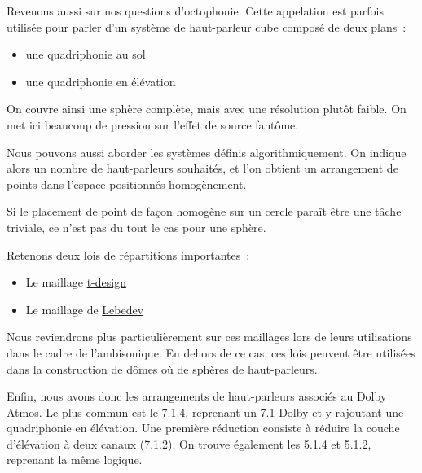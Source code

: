 \documentclass[
  letterpaper,
  DIV=11,
  numbers=noendperiod]{scrreprt}
\providecommand{\tightlist}{%
  \setlength{\itemsep}{0pt}\setlength{\parskip}{0pt}}\usepackage{longtable,booktabs,array}
\begin{document}
Revenons aussi sur nos questions d'octophonie. Cette appelation est
parfois utilisée pour parler d'un système de haut-parleur cube composé
de deux plans~:

\begin{itemize}
\tightlist
\item
  une quadriphonie au sol
\item
  une quadriphonie en élévation
\end{itemize}

On couvre ainsi une sphère complète, mais avec une résolution plutôt
faible. On met ici beaucoup de pression sur l'effet de source fantôme.

Nous pouvons aussi aborder les systèmes définis algorithmiquement. On
indique alors un nombre de haut-parleurs souhaités, et l'on obtient un
arrangement de points dans l'espace positionnés homogènement.

\begin{tcolorbox}[enhanced jigsaw, leftrule=.75mm, arc=.35mm, bottomtitle=1mm, colback=white, colbacktitle=quarto-callout-caution-color!10!white, opacityback=0, left=2mm, rightrule=.15mm, opacitybacktitle=0.6, breakable, toptitle=1mm, titlerule=0mm, bottomrule=.15mm, toprule=.15mm, coltitle=black, title=\textcolor{quarto-callout-caution-color}{\faFire}\hspace{0.5em}{Mise en garde}]

Si le placement de point de façon homogène sur un cercle paraît être une
tâche triviale, ce n'est pas du tout le cas pour une sphère.

\end{tcolorbox}

Retenons deux lois de répartitions importantes~:

\begin{itemize}
\tightlist
\item
  Le maillage
  \href{http://neilsloane.com/sphdesigns/index.html}{t-design}
\item
  Le maillage de
  \href{https://en.wikipedia.org/wiki/Lebedev_quadrature}{Lebedev}
\end{itemize}

Nous reviendrons plus particulièrement sur ces maillages lors de leurs
utilisations dans le cadre de l'ambisonique. En dehors de ce cas, ces
lois peuvent être utilisées dans la construction de dômes où de sphères
de haut-parleurs.

Enfin, nous avons donc les arrangements de haut-parleurs associés au
Dolby Atmos. Le plus commun est le 7.1.4, reprenant un 7.1 Dolby et y
rajoutant une quadriphonie en élévation. Une première réduction consiste
à réduire la couche d'élévation à deux canaux (7.1.2). On trouve
également les 5.1.4 et 5.1.2, reprenant la même logique.
\end{document}
